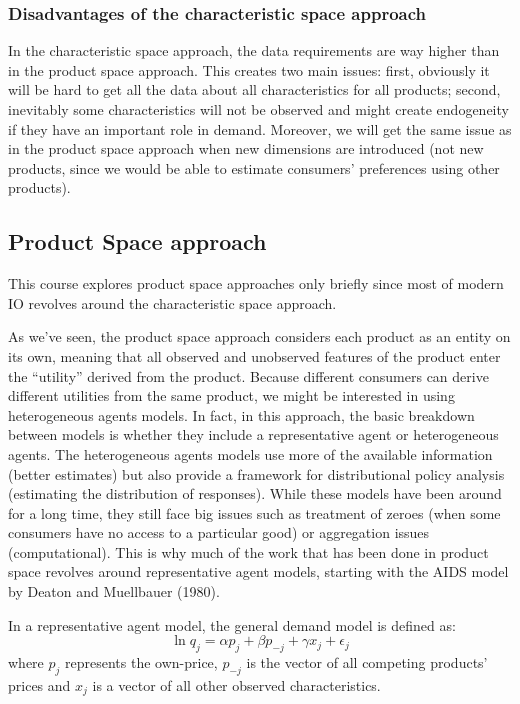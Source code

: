 \subsubsection{Disadvantages of the characteristic space approach}
 
In the characteristic space approach, the data requirements are way higher than in the product space approach. This creates two main issues: first, obviously it will be hard to get all the data about all characteristics for all products; second, inevitably some characteristics will not be observed and might create endogeneity if they have an important role in demand. Moreover, we will get the same issue as in the product space approach when new dimensions are introduced (not new products, since we would be able to estimate consumers' preferences using other products).

\subsection{Product Space approach}

This course explores product space approaches only briefly since most of modern IO revolves around the characteristic space approach.

As we've seen, the product space approach considers each product as an entity on its own, meaning that all observed and unobserved features of the product enter the ``utility'' derived from the product. Because different consumers can derive different utilities from the same product, we might be interested in using heterogeneous agents models. In fact, in this approach, the basic breakdown between models is whether they include a representative agent or heterogeneous agents. The heterogeneous agents models use more of the available information (better estimates) but also provide a framework for distributional policy analysis (estimating the distribution of responses). While these models have been around for a long time, they still face big issues such as treatment of zeroes (when some consumers have no access to a particular good) or aggregation issues (computational). This is why much of the work that has been done in product space revolves around representative agent models, starting with the AIDS model by Deaton and Muellbauer (1980).

In a representative agent model, the general demand model is defined as: $$\ln q_j = \alpha p_j + \beta p_{-j} + \gamma x_j + \epsilon_j $$ where $p_j$ represents the own-price, $p_{-j}$ is the vector of all competing products' prices and $x_j$ is a vector of all other observed characteristics.

